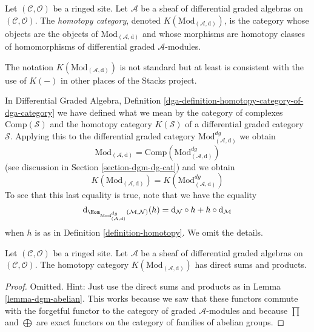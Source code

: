 \begin{definition}
\label{definition-complexes-notation}
Let $(\mathcal{C}, \mathcal{O})$ be a ringed site.
Let $\mathcal{A}$ be a sheaf of differential graded algebras
on $(\mathcal{C}, \mathcal{O})$.
The {\it homotopy category}, denoted $K(\text{Mod}_{(\mathcal{A}, \text{d})})$,
is the category whose objects are the objects of
$\text{Mod}_{(\mathcal{A}, \text{d})}$ and whose morphisms are homotopy classes
of homomorphisms of differential graded $\mathcal{A}$-modules.
\end{definition}

\noindent
The notation $K(\text{Mod}_{(\mathcal{A}, \text{d})})$
is not standard but at least is
consistent with the use of $K(-)$ in other places of the Stacks project.

\medskip\noindent
In Differential Graded Algebra, Definition
\ref{dga-definition-homotopy-category-of-dga-category}
we have defined what we mean by the category of complexes
$\text{Comp}(\mathcal{S})$
and the homotopy category $K(\mathcal{S})$
of a differential graded category $\mathcal{S}$.
Applying this to the differential graded category
$\text{Mod}^{dg}_{(\mathcal{A}, \text{d})}$ we obtain
$$
\text{Mod}_{(\mathcal{A}, \text{d})} =
\text{Comp}(\text{Mod}^{dg}_{(\mathcal{A}, \text{d})})
$$
(see discussion in Section \ref{section-dgm-dg-cat}) and we obtain
$$
K(\text{Mod}_{(\mathcal{A}, \text{d})}) =
K(\text{Mod}^{dg}_{(\mathcal{A}, \text{d})})
$$
To see that this last equality is true, note that we have the equality
$$
\text{d}_{\Hom_{\text{Mod}^{dg}_{(\mathcal{A}, \text{d})}}
(\mathcal{M}, \mathcal{N})}(h) =
\text{d}_\mathcal{N} \circ h + h \circ \text{d}_\mathcal{M}
$$
when $h$ is as in Definition \ref{definition-homotopy}. We omit the
details.

\begin{lemma}
\label{lemma-homotopy-direct-sums}
Let $(\mathcal{C}, \mathcal{O})$ be a ringed site.
Let $\mathcal{A}$ be a sheaf of differential graded algebras
on $(\mathcal{C}, \mathcal{O})$.
The homotopy category $K(\text{Mod}_{(\mathcal{A}, \text{d})})$
has direct sums and products.
\end{lemma}

\begin{proof}
Omitted. Hint: Just use the direct sums and products as in
Lemma \ref{lemma-dgm-abelian}. This works because we saw that
these functors commute with the forgetful functor to the category
of graded $\mathcal{A}$-modules and because $\prod$ and $\bigoplus$
are exact functors on the category of families of abelian groups.
\end{proof}










